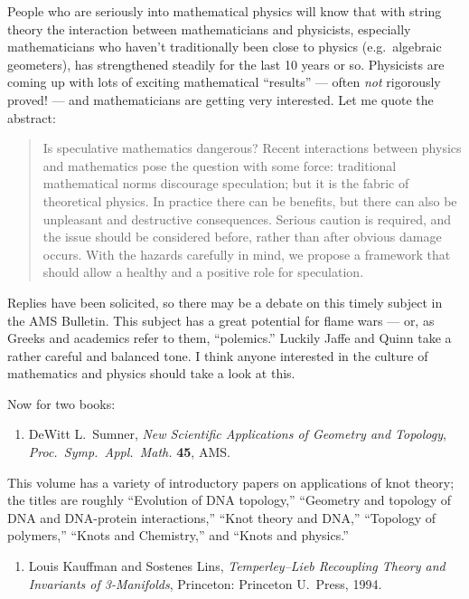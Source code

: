 \documentclass{article}
\def\tightlist{}
\begin{document}
People who are seriously into mathematical physics will know that with
string theory the interaction between mathematicians and physicists,
especially mathematicians who haven't traditionally been close to
physics (e.g.~algebraic geometers), has strengthened steadily for the
last 10 years or so. Physicists are coming up with lots of exciting
mathematical ``results'' --- often \emph{not} rigorously proved! --- and
mathematicians are getting very interested. Let me quote the abstract:

\begin{quote}
Is speculative mathematics dangerous? Recent interactions between
physics and mathematics pose the question with some force: traditional
mathematical norms discourage speculation; but it is the fabric of
theoretical physics. In practice there can be benefits, but there can
also be unpleasant and destructive consequences. Serious caution is
required, and the issue should be considered before, rather than after
obvious damage occurs. With the hazards carefully in mind, we propose a
framework that should allow a healthy and a positive role for
speculation.
\end{quote}

Replies have been solicited, so there may be a debate on this timely
subject in the AMS Bulletin. This subject has a great potential for
flame wars --- or, as Greeks and academics refer to them, ``polemics.''
Luckily Jaffe and Quinn take a rather careful and balanced tone. I think
anyone interested in the culture of mathematics and physics should take
a look at this.

Now for two books:

\begin{enumerate}
\def\labelenumi{\arabic{enumi})}
\setcounter{enumi}{1}
\tightlist
\item
  DeWitt L.\ Sumner, \emph{New Scientific Applications of Geometry and Topology},
   \emph{Proc.\ Symp.\ Appl.\ Math.} \textbf{45}, AMS.
\end{enumerate}

This volume has a variety of introductory papers on applications of knot
theory; the titles are roughly ``Evolution of DNA topology,'' ``Geometry
and topology of DNA and DNA-protein interactions,'' ``Knot theory and
DNA,'' ``Topology of polymers,'' ``Knots and Chemistry,'' and ``Knots
and physics.''

\begin{enumerate}
\def\labelenumi{\arabic{enumi})}
\setcounter{enumi}{2}
\tightlist
\item
  Louis Kauffman and Sostenes Lins, \emph{Temperley--Lieb Recoupling Theory and 
  Invariants of 3-Manifolds}, Princeton: Princeton U.\ Press, 1994.
\end{enumerate}
\end{document}
